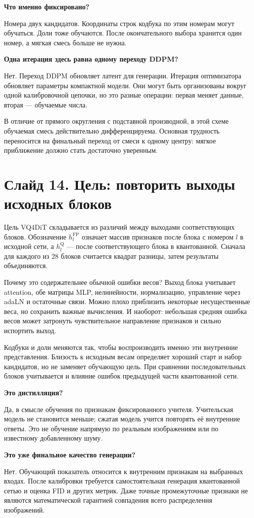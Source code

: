 \documentclass[a4paper,11pt]{article}
\newcommand{\slide}[2]{\clearpage\section*{Слайд #1. #2}}
\newcommand{\question}[1]{\par\textbf{#1}\par}
\begin{document}
\question{Что именно фиксировано?}
Номера двух кандидатов. Координаты строк кодбука по этим номерам
могут обучаться. Доли тоже обучаются. После окончательного выбора
хранится один номер, а мягкая смесь больше не нужна.

\question{Одна итерация здесь равна одному переходу DDPM?}
Нет. Переход DDPM обновляет латент для генерации.
Итерация оптимизатора обновляет параметры компактной модели.
Они могут быть организованы вокруг одной калибровочной цепочки,
но это разные операции: первая меняет данные, вторая --- обучаемые числа.

В отличие от прямого округления с подставной производной,
в этой схеме обучаемая смесь действительно дифференцируема.
Основная трудность переносится на финальный переход от смеси
к одному центру: мягкое приближение должно стать достаточно уверенным.

\slide{14}{Цель: повторить выходы исходных блоков}
Цель VQ4DiT складывается из различий между выходами соответствующих
блоков. Обозначение $h_l^{\mathrm{FP}}$ означает массив признаков
после блока с номером $l$ в исходной сети, а $h_l^{\mathrm Q}$ ---
после соответствующего блока в квантованной. Сначала для каждого
из 28 блоков считается квадрат разницы, затем результаты объединяются.

Почему это содержательнее обычной ошибки весов? Выход блока
учитывает attention, обе матрицы MLP, нелинейности, нормализацию,
управление через adaLN и остаточные связи. Можно плохо приблизить
некоторые несущественные веса, но сохранить важные вычисления.
И наоборот: небольшая средняя ошибка весов может затронуть
чувствительное направление признаков и сильно испортить выход.

Кодбуки и доли меняются так, чтобы воспроизводить именно эти
внутренние представления. Близость к исходным весам определяет
хороший старт и набор кандидатов, но не заменяет обучающую цель.
При сравнении последовательных блоков учитывается и влияние
ошибок предыдущей части квантованной сети.

\question{Это дистилляция?}
Да, в смысле обучения по признакам фиксированного учителя.
Учительская модель не становится меньше; сжатая модель учится
повторять её внутренние ответы. Это не обучение напрямую
по реальным изображениям или по известному добавленному шуму.

\question{Это уже финальное качество генерации?}
Нет. Обучающий показатель относится к внутренним признакам
на выбранных входах. После калибровки требуется самостоятельная
генерация квантованной сетью и оценка FID и других метрик.
Даже точные промежуточные признаки не являются математической
гарантией совпадения всего распределения изображений.
\end{document}
